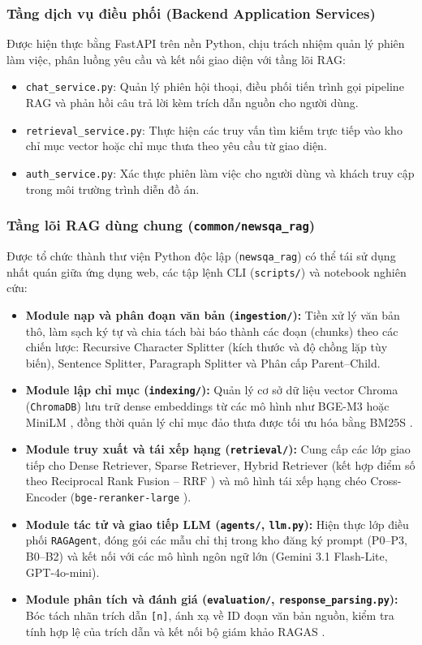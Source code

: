 \subsubsection{Tầng dịch vụ điều phối (Backend Application Services)}
Được hiện thực bằng FastAPI trên nền Python, chịu trách nhiệm quản lý phiên làm việc, phân luồng yêu cầu và kết nối giao diện với tầng lõi RAG:
\begin{itemize}
  \item \texttt{chat\_service.py}: Quản lý phiên hội thoại, điều phối tiến trình gọi pipeline RAG và phản hồi câu trả lời kèm trích dẫn nguồn cho người dùng.
  \item \texttt{retrieval\_service.py}: Thực hiện các truy vấn tìm kiếm trực tiếp vào kho chỉ mục vector hoặc chỉ mục thưa theo yêu cầu từ giao diện.
  \item \texttt{auth\_service.py}: Xác thực phiên làm việc cho người dùng và khách truy cập trong môi trường trình diễn đồ án.
\end{itemize}

\subsubsection{Tầng lõi RAG dùng chung (\texttt{common/newsqa\_rag})}
Được tổ chức thành thư viện Python độc lập (\texttt{newsqa\_rag}) có thể tái sử dụng nhất quán giữa ứng dụng web, các tập lệnh CLI (\texttt{scripts/}) và notebook nghiên cứu:
\begin{itemize}
  \item \textbf{Module nạp và phân đoạn văn bản (\texttt{ingestion/}):} Tiền xử lý văn bản thô, làm sạch ký tự và chia tách bài báo thành các đoạn (chunks) theo các chiến lược: Recursive Character Splitter (kích thước và độ chồng lặp tùy biến), Sentence Splitter, Paragraph Splitter và Phân cấp Parent--Child.
  \item \textbf{Module lập chỉ mục (\texttt{indexing/}):} Quản lý cơ sở dữ liệu vector Chroma (\texttt{ChromaDB}) lưu trữ dense embeddings từ các mô hình như BGE-M3 \cite{chen2024bge} hoặc MiniLM \cite{reimers2019sentence}, đồng thời quản lý chỉ mục đảo thưa được tối ưu hóa bằng BM25S \cite{robertson2009probabilistic}.
  \item \textbf{Module truy xuất và tái xếp hạng (\texttt{retrieval/}):} Cung cấp các lớp giao tiếp cho Dense Retriever, Sparse Retriever, Hybrid Retriever (kết hợp điểm số theo Reciprocal Rank Fusion -- RRF \cite{cormack2009reciprocal}) và mô hình tái xếp hạng chéo Cross-Encoder (\texttt{bge-reranker-large} \cite{xiao2023c}).
  \item \textbf{Module tác tử và giao tiếp LLM (\texttt{agents/}, \texttt{llm.py}):} Hiện thực lớp điều phối \texttt{RAGAgent}, đóng gói các mẫu chỉ thị trong kho đăng ký prompt (P0--P3, B0--B2) và kết nối với các mô hình ngôn ngữ lớn (Gemini 3.1 Flash-Lite, GPT-4o-mini).
  \item \textbf{Module phân tích và đánh giá (\texttt{evaluation/}, \texttt{response\_parsing.py}):} Bóc tách nhãn trích dẫn \texttt{[n]}, ánh xạ về ID đoạn văn bản nguồn, kiểm tra tính hợp lệ của trích dẫn và kết nối bộ giám khảo RAGAS \cite{es2023ragas}.
\end{itemize}

